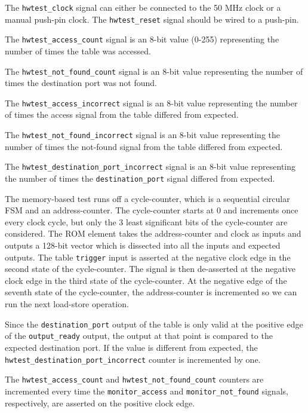 \documentclass{article}
\begin{document}
The \texttt{hwtest\_clock} signal can either be connected to the 50 MHz clock or a manual push-pin clock. The \texttt{hwtest\_reset} signal should be wired to a push-pin.

The \texttt{hwtest\_access\_count} signal is an 8-bit value (0-255) representing the number of times the table was accessed.

The \texttt{hwtest\_not\_found\_count} signal is an 8-bit value representing the number of times the destination port was not found.

The \texttt{hwtest\_access\_incorrect} signal is an 8-bit value representing the number of times the access signal from the table differed from expected.

The \texttt{hwtest\_not\_found\_incorrect} signal is an 8-bit value representing the number of times the not-found signal from the table differed from expected.

The \texttt{hwtest\_destination\_port\_incorrect} signal is an 8-bit value representing the number of times the \texttt{destination\_port} signal differed from expected.

The memory-based test runs off a cycle-counter, which is a sequential circular FSM and an address-counter. The cycle-counter starts at 0 and increments once every clock cycle, but only the 3 least significant bits of the cycle-counter are considered. The ROM element takes the address-counter and clock as inputs and outputs a 128-bit vector which is dissected into all the inputs and expected outputs. The table \texttt{trigger} input is asserted at the negative clock edge in the second state of the cycle-counter. The signal is then de-asserted at the negative clock edge in the third state of the cycle-counter. At the negative edge of the seventh state of the cycle-counter, the address-counter is incremented so we can run the next load-store operation. 

Since the \texttt{destination\_port} output of the table is only valid at the positive edge of the \texttt{output\_ready} output, the output at that point is compared to the expected destination port. If the value is different from expected, the \texttt{hwtest\_destination\_port\_incorrect} counter is incremented by one.

The \texttt{hwtest\_access\_count} and \texttt{hwtest\_not\_found\_count} counters are incremented every time the \texttt{monitor\_access} and \texttt{monitor\_not\_found} signals, respectively, are asserted on the positive clock edge. 
\end{document}
